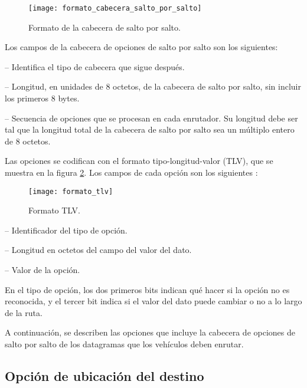 \begin{figure}[th!]
\centering
\texttt{[image: formato\_cabecera\_salto\_por\_salto]}
\decoRule
\caption[Formato de la cabecera de salto por salto]{Formato de la cabecera de
salto por salto.}
\label{fig:formato_cabecera_salto_por_salto}
\end{figure}

Los campos de la cabecera de opciones de salto por salto son los siguientes:

 -- Identifica el tipo de cabecera que
sigue después.

 -- Longitud, en unidades de 8
octetos, de la cabecera de salto por salto, sin incluir los primeros 8 bytes.

 -- Secuencia de opciones que se procesan
en cada enrutador. Su longitud debe ser tal que la longitud total de la
cabecera de salto por salto sea un múltiplo entero de 8 octetos.

Las opciones se codifican con el formato tipo-longitud-valor (TLV), que se
muestra en la figura \ref{fig:formato_tlv}. Los campos de cada opción son los
siguientes \cite{RFC2460}:

\begin{figure}[th!]
\centering
\texttt{[image: formato\_tlv]}
\decoRule
\caption[Formato TLV]{Formato TLV.}
\label{fig:formato_tlv}
\end{figure}

 -- Identificador del tipo de opción.

 -- Longitud en octetos del campo del
valor del dato.

 -- Valor de la opción.

En el tipo de opción, los dos primeros bits indican qué hacer si la opción no
es reconocida, y el tercer bit indica si el valor del dato puede cambiar o no a
lo largo de la ruta.

A continuación, se describen las opciones que incluye la cabecera de opciones de
salto por salto de los datagramas que los vehículos deben enrutar.

\subsection{Opción de ubicación del destino}
\label{subsec:opcion_de_ubicacion_del_destino}

